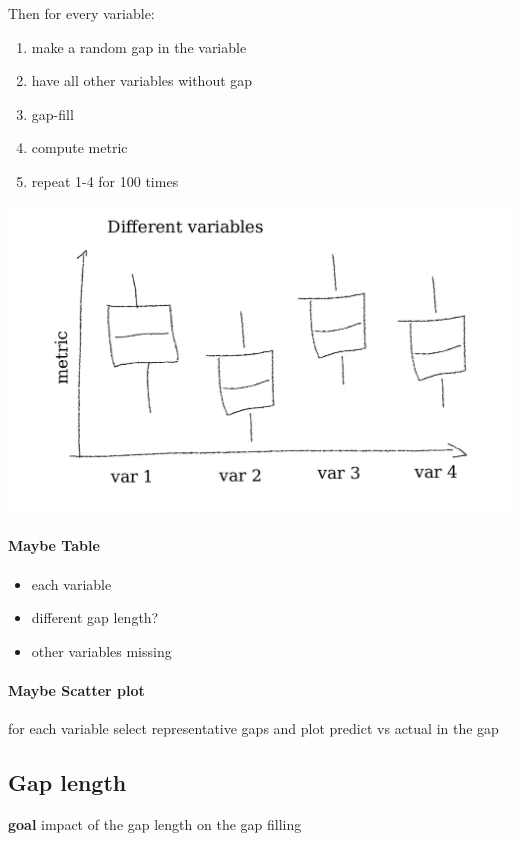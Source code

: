 \documentclass{article}
\let\Oldsubsection\subsection
\renewcommand{\subsection}{\FloatBarrier\Oldsubsection}
\begin{document}
Then for every variable:
\begin{enumerate}
    \item make a random gap in the variable
    \item have all other variables without gap
    \item gap-fill
    \item compute metric
    \item repeat 1-4 for 100 times
\end{enumerate}

\includegraphics[width=\textwidth]{example_different_variables}


\paragraph{Maybe Table}


\begin{itemize}
    \item each variable
    \item different gap length?
    \item other variables missing
\end{itemize}

\paragraph{Maybe Scatter plot}

for each variable select representative gaps and plot predict vs actual in the gap

\subsection{Gap length}

\textbf{goal} impact of the gap length on the gap filling
\end{document}
